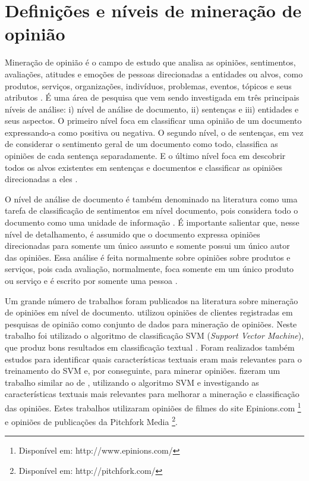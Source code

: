 \documentclass[template.tex]{subfiles}
\begin{document}
\section{Definições e níveis de mineração de opinião}

Mineração de opinião é o campo de estudo que analisa as opiniões, sentimentos, avaliações, atitudes e emoções de pessoas direcionadas a entidades ou alvos, como produtos, serviços, organizações, indivíduos, problemas, eventos, tópicos e seus atributos \cite{bing:2012}. É uma área de pesquisa que vem sendo investigada em três principais níveis de análise: i) nível de análise de documento, ii) sentenças e iii) entidades e seus aspectos. O primeiro nível foca em classificar uma opinião de um documento expressando-a como positiva ou negativa. O segundo nível, o de sentenças, em vez de considerar o sentimento geral de um documento como todo, classifica as opiniões de cada sentença separadamente. E o último nível foca em descobrir todos os alvos existentes em sentenças e documentos e classificar as opiniões direcionadas a eles \cite{bing:2012}.

O nível de análise de documento é também denominado na literatura como uma tarefa de classificação de sentimentos em nível documento, pois considera todo o documento como uma unidade de informação \cite{bing:2012, pang:2008}. É importante salientar que, nesse nível de detalhamento, é assumido que o documento expressa opiniões direcionadas para somente um único assunto e somente possui um único autor das opiniões. Essa análise é feita normalmente sobre opiniões sobre produtos e serviços, pois cada avaliação, normalmente, foca somente em um único produto ou serviço e é escrito por somente uma pessoa \cite{bing:2012}.

Um grande número de trabalhos foram publicados na literatura sobre mineração de opiniões em nível de documento. \cite{gamon2004sentiment} utilizou opiniões de clientes registradas em pesquisas de opinião como conjunto de dados para mineração de opiniões. Neste trabalho foi utilizado o algoritmo de classificação SVM (\textit{Support Vector Machine}), que produz bons resultados em classificação textual \cite{joachims1998text}. Foram realizados também estudos para identificar quais características textuais eram mais relevantes para o treinamento do SVM e, por conseguinte, para minerar opiniões. \cite{mullen2004sentiment} fizeram um trabalho similar ao de \cite{gamon2004sentiment}, utilizando o algoritmo SVM e investigando as características textuais mais relevantes para melhorar a mineração e classificação das opiniões. Estes trabalhos utilizaram opiniões de filmes do site Epinions.com \footnote{Disponível em: http://www.epinions.com/} e opiniões de publicações da Pitchfork Media \footnote{Disponível em: http://pitchfork.com/}.
\end{document}
